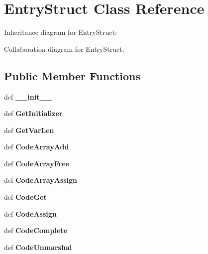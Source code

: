 \section{\-Entry\-Struct \-Class \-Reference}
\label{classevent__rpcgen_1_1_entry_struct}


\-Inheritance diagram for \-Entry\-Struct\-:


\-Collaboration diagram for \-Entry\-Struct\-:
\subsection*{\-Public \-Member \-Functions}
\begin{DoxyCompactItemize}
\item 
def {\bfseries \-\_\-\-\_\-init\-\_\-\-\_\-}\label{classevent__rpcgen_1_1_entry_struct_ac775ee34451fdfa742b318538164070e}

\item 
def {\bfseries \-Get\-Initializer}\label{classevent__rpcgen_1_1_entry_struct_acc967744885bfbdf0f0aeed27c888d23}

\item 
def {\bfseries \-Get\-Var\-Len}\label{classevent__rpcgen_1_1_entry_struct_a08d14096a163fb84ee8c3536eab2ff47}

\item 
def {\bfseries \-Code\-Array\-Add}\label{classevent__rpcgen_1_1_entry_struct_a1f454357f69d9ec15f1a68c95d0e0326}

\item 
def {\bfseries \-Code\-Array\-Free}\label{classevent__rpcgen_1_1_entry_struct_a6041961df8fdc24bd66777ade5b196c5}

\item 
def {\bfseries \-Code\-Array\-Assign}\label{classevent__rpcgen_1_1_entry_struct_a4a82db0bf599d23f74a63843f450cea5}

\item 
def {\bfseries \-Code\-Get}\label{classevent__rpcgen_1_1_entry_struct_ac4f27f4fd487ba8b17807758ea0b5234}

\item 
def {\bfseries \-Code\-Assign}\label{classevent__rpcgen_1_1_entry_struct_a6b6a08cd00ffadb276d29fcbf0dc3bfc}

\item 
def {\bfseries \-Code\-Complete}\label{classevent__rpcgen_1_1_entry_struct_a72a2652b6d341ea05be549a6657a43e9}

\item 
def {\bfseries \-Code\-Unmarshal}\label{classevent__rpcgen_1_1_entry_struct_a4f7edbd130c034cfa9d24b7be679f8af}


\end{DoxyCompactItemize}
